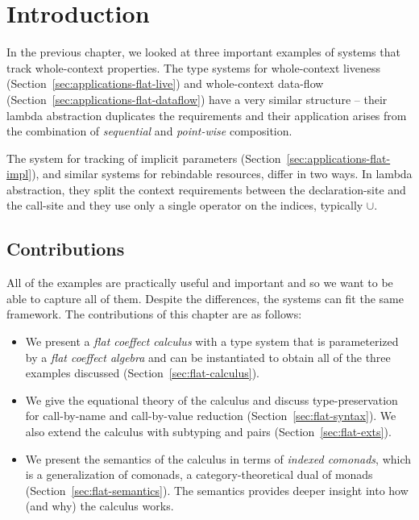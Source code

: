 \section{Introduction}
\label{sec:flat-intro}

In the previous chapter, we looked at three important examples of systems that track whole-context 
properties. The type systems for whole-context liveness (Section~\ref{sec:applications-flat-live}) 
and whole-context data-flow (Section~\ref{sec:applications-flat-dataflow}) have a very similar 
structure -- their lambda abstraction duplicates the requirements and their application arises
from the combination of \emph{sequential} and \emph{point-wise} composition.

The system for tracking of implicit parameters (Section~\ref{sec:applications-flat-impl}), and
similar systems for rebindable resources, differ in two ways. In lambda abstraction, they split
the context requirements between the declaration-site and the call-site and they use only a single
operator on the indices, typically $\cup$.


\subsection{Contributions}

All of the examples are practically useful and important and so we want to be able to capture all
of them. Despite the differences, the systems can fit the same framework. The contributions of this
chapter are as follows:

\begin{itemize}
\item We present a \emph{flat coeffect calculus} with a type system that is parameterized by a 
  \emph{flat coeffect algebra} and can be instantiated to obtain all of the three examples
  discussed (Section~\ref{sec:flat-calculus}).
  
\item We give the equational theory of the calculus and discuss type-preservation for call-by-name
  and call-by-value reduction (Section~\ref{sec:flat-syntax}). We also extend the calculus
  with subtyping and pairs (Section~\ref{sec:flat-exts}).
  
\item We present the semantics of the calculus in terms of \emph{indexed comonads}, which is a
  generalization of comonads, a category-theoretical dual of monads (Section~\ref{sec:flat-semantics}).
  The semantics provides deeper insight into how (and why) the calculus works.
\end{itemize}

